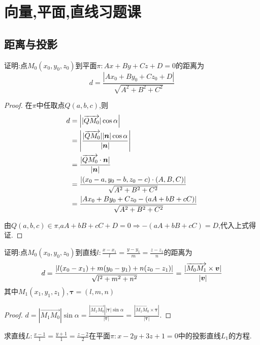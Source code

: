\chapter{向量,平面,直线习题课}

\section{距离与投影}

\begin{example}
    证明:点$M_0(x_0,y_0,z_0)$到平面$\pi:Ax+By+Cz+D=0$的距离为
    $$
    d = \frac{|Ax_0+By_0+Cz_0+D|}{\sqrt{A^2+B^2+C^2}}
    $$
\end{example}

\begin{proof}
    在$\pi$中任取点$Q(a,b,c)$,则
    \begin{align*}
        d &= \left| |\overrightarrow{QM_0}|\cos\alpha \right| \\
        &= \left| \frac{|\overrightarrow{QM_0}| |\bm{n}| \cos \alpha }{|\bm{n}|} \right| \\
        &= \frac{|\overrightarrow{QM_0} \cdot \bm{n}|}{|\bm{n}|} \\
        &= \frac{|(x_0-a, y_0-b, z_0-c) \cdot (A,B,C)|}{\sqrt{A^2+B^2+C^2}} \\
        &= \frac{|Ax_0+By_0+Cz_0 - (aA+bB+cC)|}{\sqrt{A^2+B^2+C^2}} \\
    \end{align*}

    由$Q(a,b,c) \in \pi$,$aA+bB+cC+D = 0 \Rightarrow -(aA+bB+cC) = D$,代入上式得证.
\end{proof}

\begin{example}
    证明:点$M_0(x_0,y_0,z_0)$到直线$l:\frac{x-x_1}{l} = \frac{y-y_1}{m} = \frac{z-z_1}{n}$的距离为
    $$
    d = \frac{|l(x_0-x_1)+m(y_0-y_1)+n(z_0-z_1)|}{\sqrt{l^2+m^2+n^2}} = \frac{|\overrightarrow{M_0 M_1} \times \bm{v}|}{|\bm{v}|}
    $$
    其中$M_1(x_1,y_1,z_1),\bm{\tau} = (l,m,n)$

\end{example}

\begin{proof}
    $d = |\overrightarrow{M_1 M_0} |\sin \alpha = \frac{|\overrightarrow{M_1 M_0}| | \bm{\tau} | \sin \alpha }{|\bm{\tau}|} = \frac{|\overrightarrow{M_1 M_0}  \times \bm \tau |}{|\bm \tau|}$.
\end{proof}

\begin{example}
    求直线$L: \frac{x-1}{1} = \frac{y+1}{1} = \frac{z-2}{2}$在平面$\pi: x-2y+3z+1 = 0$中的投影直线$L_1$的方程.
\end{example}

